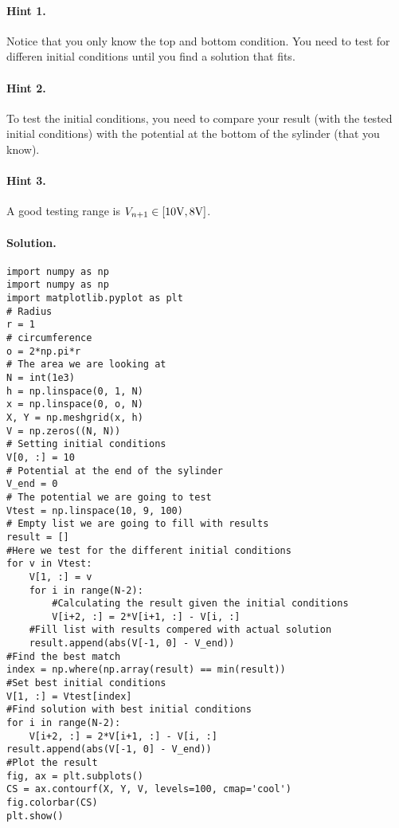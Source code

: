 \documentclass[%
oneside,                 %
final,                   %
10pt]{article}
\newenvironment{doconceexercise}{}{}
\begin{document}
\begin{doconceexercise}
\paragraph{Hint 1.}
Notice that you only know the top and bottom condition. You need to test for differen initial conditions until you find a solution that fits.



\paragraph{Hint 2.}
To test the initial conditions, you need to compare your result (with the tested initial conditions) with the potential at the bottom of the sylinder (that you know).



\paragraph{Hint 3.}
A good testing range is $V_{n+1} \in [10\rm{V}, 8\rm{V}]$.



\paragraph{Solution.}
\begin{verbatim}import numpy as np
import numpy as np
import matplotlib.pyplot as plt
# Radius
r = 1
# circumference
o = 2*np.pi*r
# The area we are looking at
N = int(1e3)
h = np.linspace(0, 1, N)
x = np.linspace(0, o, N)
X, Y = np.meshgrid(x, h)
V = np.zeros((N, N))
# Setting initial conditions
V[0, :] = 10
# Potential at the end of the sylinder
V_end = 0
# The potential we are going to test
Vtest = np.linspace(10, 9, 100)
# Empty list we are going to fill with results
result = []
#Here we test for the different initial conditions
for v in Vtest:
    V[1, :] = v
    for i in range(N-2):
        #Calculating the result given the initial conditions
        V[i+2, :] = 2*V[i+1, :] - V[i, :]
    #Fill list with results compered with actual solution
    result.append(abs(V[-1, 0] - V_end))
#Find the best match
index = np.where(np.array(result) == min(result))
#Set best initial conditions
V[1, :] = Vtest[index]
#Find solution with best initial conditions
for i in range(N-2):
    V[i+2, :] = 2*V[i+1, :] - V[i, :]
result.append(abs(V[-1, 0] - V_end))
#Plot the result
fig, ax = plt.subplots()
CS = ax.contourf(X, Y, V, levels=100, cmap='cool')
fig.colorbar(CS)
plt.show()
\end{verbatim}


\end{doconceexercise}



\end{document}
